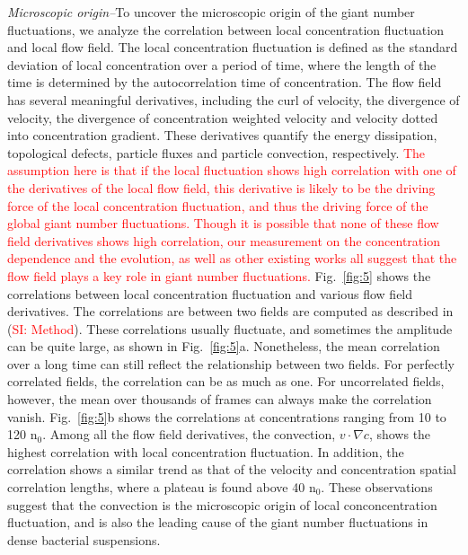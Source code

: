 \documentclass[twocolumn,aps,prl,amsmath,amssymb,longbibliography]{revtex4-2}
\begin{document}
\textit{Microscopic origin--}To uncover the microscopic origin of the giant number fluctuations, we analyze the correlation between local concentration fluctuation and local flow field. The local concentration fluctuation is defined as the standard deviation of local concentration over a period of time, where the length of the time is determined by the autocorrelation time of concentration. The flow field has several meaningful derivatives, including the curl of velocity, the divergence of velocity, the divergence of concentration weighted velocity and velocity dotted into concentration gradient. These derivatives quantify the energy dissipation, topological defects, particle fluxes and particle convection, respectively. \textcolor{red}{The assumption here is that if the local fluctuation shows high correlation with one of the derivatives of the local flow field, this derivative is likely to be the driving force of the local concentration fluctuation, and thus the driving force of the global giant number fluctuations. Though it is possible that none of these flow field derivatives shows high correlation, our measurement on the concentration dependence and the evolution, as well as other existing works \cite{PhysRevLett.100.178103, Schaller4488} all suggest that the flow field plays a key role in giant number fluctuations.} Fig.~\ref{fig:5} shows the correlations between local concentration fluctuation and various flow field derivatives. The correlations are between two fields are computed as described in (\textcolor{red}{SI: Method}). These correlations usually fluctuate, and sometimes the amplitude can be quite large, as shown in Fig.~\ref{fig:5}a. Nonetheless, the mean correlation over a long time can still reflect the relationship between two fields. For perfectly correlated fields, the correlation can be as much as one. For uncorrelated fields, however, the mean over thousands of frames can always make the correlation vanish.
Fig.~\ref{fig:5}b shows the correlations at concentrations ranging from 10 to 120 n$_0$.
Among all the flow field derivatives, the convection, $v\cdot\nabla c$, shows the highest correlation with local concentration fluctuation. In addition, the correlation shows a similar trend as that of the velocity and concentration spatial correlation lengths, where a plateau is found above 40 n$_0$. These observations suggest that the convection is the microscopic origin of local conconcentration fluctuation, and is also the leading cause of the giant number fluctuations in dense bacterial suspensions.
\end{document}
